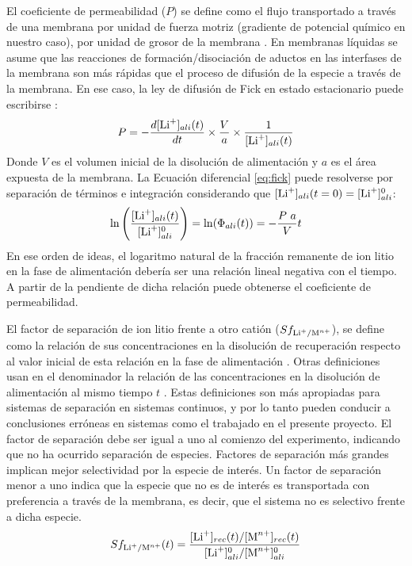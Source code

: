 El coeficiente de permeabilidad ($P$)  se define como el flujo transportado a través de una membrana por unidad de fuerza motriz (gradiente de potencial químico en nuestro caso), por unidad de grosor de la membrana \citep{Koros}. En membranas líquidas se asume que las reacciones de formación/disociación de aductos en las interfases de la membrana son más rápidas que el proceso de difusión de la especie a través de la membrana. En ese caso, la ley de difusión de Fick en estado estacionario puede escribirse \citep{Ma2000}:
\begin{equation}\label{eq:fick}
    P=-\frac{d[\ce{Li^+}]_{ali}(t)}{dt}\times\frac{V}{a}\times\frac{1}{[\ce{Li^+}]_{ali}(t)}
\end{equation}
Donde $V$ es el volumen inicial de la disolución de alimentación y $a$ es el área expuesta de la membrana. La Ecuación diferencial \ref{eq:fick} puede resolverse por separación de términos e integración considerando que $[\ce{Li^+}]_{ali}(t=0)=[\ce{Li^+}]_{ali}^0$:
\begin{equation}\label{eq:coefPerm}
    \ln{\Bigg(\frac{[\ce{Li^+}]_{ali}(t)}{[\ce{Li^+}]_{ali}^0}\Bigg)}=\ln(\Phi_{ali}(t))=-\frac{P~a}{V}t
\end{equation}
En ese orden de ideas, el logaritmo natural de la fracción remanente de ion litio en la fase de alimentación debería ser una relación lineal negativa con el tiempo. A partir de la pendiente de dicha relación puede obtenerse el coeficiente de permeabilidad.

El factor de separación  de ion litio frente a otro catión  ($Sf_{\ce{Li+}/\ce{M^n+}}$), se define como la relación de sus concentraciones en la disolución de recuperación respecto al valor inicial de esta relación en la fase de alimentación \citep{Chen2018}. Otras definiciones usan en el denominador la relación de las concentraciones en la disolución de alimentación al mismo tiempo $t$ \citep{Koros, sharma2016}. Estas definiciones son más apropiadas para sistemas de separación en sistemas continuos, y por lo tanto pueden conducir a conclusiones erróneas en sistemas como el trabajado en el presente proyecto. El factor de separación debe ser igual a uno al comienzo del experimento, indicando que no ha ocurrido separación de especies. Factores de separación más grandes implican mejor selectividad por la especie de interés. Un factor de separación menor a uno indica que la especie que no es de interés es transportada con preferencia a través de la membrana, es decir, que el sistema no es selectivo frente a dicha especie.
\begin{equation}
    Sf_{\ce{Li^+}/\ce{M^n+}}(t)=\frac{[\ce{Li^+}]_{rec}(t)/[\ce{M^n+}]_{rec}(t)}{[\ce{Li^+}]_{ali}^0/[\ce{M^n+}]_{ali}^0}
\end{equation}

